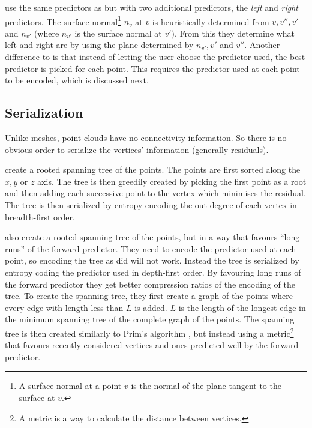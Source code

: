 \documentclass{report}
\begin{document}
\citep{merrycomp} use the same predictors as \citep{gumholdcomp} but with two
additional predictors, the \emph{left} and \emph{right} predictors. The
surface normal\footnote{A surface normal at a point $v$ is the normal of the
  plane tangent to the surface at $v$.} $n_v$ at $v$ is heuristically
determined from $v, v'', v'$ and $n_{v'}$ (where $n_{v'}$ is the surface
normal at $v'$). From this they determine what left and right are by using the
plane determined by $n_{v'}, v'$ and $v''$. Another difference to
\citep{gumholdcomp} is that instead of letting the user choose the
predictor used, the best predictor is picked for each point. This requires the
predictor used at each point to be encoded, which is discussed next.


\subsection{Serialization}
\label{sec:serialization}

Unlike meshes, point clouds have no connectivity information. So there is no
obvious order to serialize the vertices' information (generally residuals).

\citep{gumholdcomp} create a rooted spanning tree of the points. The points
are first sorted along the $x, y$ or $z$ axis. The tree is then greedily
created by picking the first point as a root and then adding each successive
point to the vertex which minimises the residual. The tree is then serialized
by entropy encoding the out degree of each vertex in breadth-first order.

\citep{merrycomp} also create a rooted spanning tree of the points, but in a
way that favours ``long runs'' of the forward predictor. They need to encode
the predictor used at each point, so encoding the tree as \citep{gumholdcomp}
did will not work. Instead the tree is serialized by entropy coding the
predictor used in depth-first order. By favouring long runs of the forward
predictor they get better compression ratios of the encoding of the tree. To
create the spanning tree, they first create a graph of the points where every
edge with length less than $L$ is added. $L$ is the length of the longest edge
in the minimum spanning tree of the complete graph of the points. The spanning
tree is then created similarly to Prim's algorithm \citep[p.\ 457]{sedgewick},
but instead using a metric\footnote{A metric is a way to calculate the
  distance between vertices.} that favours recently considered vertices and
ones predicted well by the forward predictor.
\end{document}
